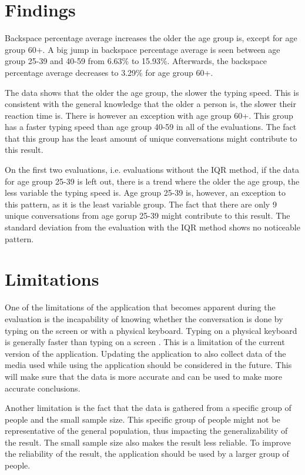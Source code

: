 \section{Findings}

Backspace percentage average increases the older the age group is, except for age group 60+.
A big jump in backspace percentage average is seen between age group 25-39 and 40-59 from 6.63\% to 15.93\%.
Afterwards, the backspace percentage average decreases to 3.29\% for age group 60+.

The data shows that the older the age group, the slower the typing speed.
This is consistent with the general knowledge that the older a person is, the slower their reaction time is.
There is however an exception with age group 60+.
This group has a faster typing speed than age group 40-59 in all of the evaluations.
The fact that this group has the least amount of unique conversations might contribute to this result.

On the first two evaluations, i.e. evaluations without the \ac{IQR} method, if the data for age group 25-39 is left out, there is a trend where the older the age group, the less variable the typing speed is.
Age group 25-39 is, however, an exception to this pattern, as it is the least variable group.
The fact that there are only 9 unique conversations from age gorup 25-39 might contribute to this result.
The standard deviation from the evaluation with the \ac{IQR} method shows no noticeable pattern.

\section{Limitations}

One of the limitations of the application that becomes apparent during the evaluation is the incapability of knowing whether the conversation is done by typing on the screen or with a physical keyboard.
Typing on a physical keyboard is generally faster than typing on a screen \cite{Varcholik2012}.
This is a limitation of the current version of the application.
Updating the application to also collect data of the media used while using the application should be considered in the future.
This will make sure that the data is more accurate and can be used to make more accurate conclusions.

Another limitation is the fact that the data is gathered from a specific group of people and the small sample size.
This specific group of people might not be representative of the general population, thus impacting the generalizability of the result.
The small sample size also makes the result less reliable.
To improve the reliability of the result, the application should be used by a larger group of people.